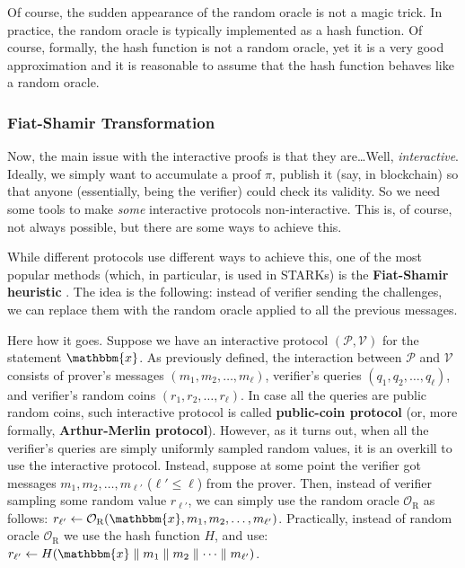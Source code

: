 \documentclass[../lecture-notes-148x210.tex]{subfiles}
\begin{document}
\begin{remark}
    Of course, the sudden appearance of the random oracle is not a magic trick.
    In practice, the random oracle is typically implemented as a hash function.
    Of course, formally, the hash function is not a random oracle, yet it is a
    very good approximation and it is reasonable to assume that the hash
    function behaves like a random oracle.
\end{remark}

\subsubsection{Fiat-Shamir Transformation}

Now, the main issue with the interactive proofs is that they are\ldots Well,
\textit{interactive}. Ideally, we simply want to accumulate a proof $\pi$,
publish it (say, in blockchain) so that anyone (essentially, being the verifier)
could check its validity. So we need some tools to make \textit{some}
interactive protocols non-interactive. This is, of course, not always possible,
but there are some ways to achieve this.

While different protocols use different ways to achieve this, one of the most
popular methods (which, in particular, is used in STARKs) is the
\textbf{Fiat-Shamir heuristic} \cite{fiat1986}. The idea is the following: instead of verifier
sending the challenges, we can replace them with the random oracle applied to
all the previous messages.

Here how it goes. Suppose we have an interactive protocol $(\mathcal{P},
\mathcal{V})$ for the statement $\mathbbm{x}$. As previously defined, the
interaction between $\mathcal{P}$ and $\mathcal{V}$ consists of prover's
messages $(m_1,m_2,\dots,m_{\ell})$, verifier's queries
$(q_1,q_2,\dots,q_{\ell})$, and verifier's random coins
$(r_1,r_2,\dots,r_{\ell})$. In case all the queries are public random coins,
such interactive protocol is called \textbf{public-coin protocol} (or, more
formally, \textbf{Arthur-Merlin protocol}). However, as it turns out, when all
the verifier's queries are simply uniformly sampled random values, it is an
overkill to use the interactive protocol. Instead, suppose at some point the
verifier got messages $m_1,m_2,\dots,m_{\ell'}$ ($\ell' \leq \ell$) from the
prover. Then, instead of verifier sampling some random value $r_{\ell'}$, we can
simply use the random oracle $\mathcal{O}_{\text{R}}$ as follows: $r_{\ell'}
\gets \mathcal{O}_{\text{R}}(\mathbbm{x},m_1,m_2,\dots,m_{\ell'})$. Practically,
instead of random oracle $\mathcal{O}_{\text{R}}$ we use the hash function $H$,
and use: $r_{\ell'} \gets H(\mathbbm{x} \parallel m_1 \parallel m_2 \parallel \dots
\parallel m_{\ell'})$.
\end{document}
